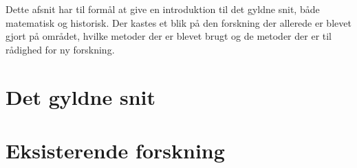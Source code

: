 \textsf{
Dette afsnit har til formål at give en introduktion til det gyldne snit,
både matematisk og historisk. Der kastes et blik på den forskning der
allerede er blevet gjort på området, hvilke metoder der er blevet brugt
og de metoder der er til rådighed for ny forskning.
}

\section{Det gyldne snit\label{section_gyldne_snit}}


\section{Eksisterende forskning\label{section_forskning}}


